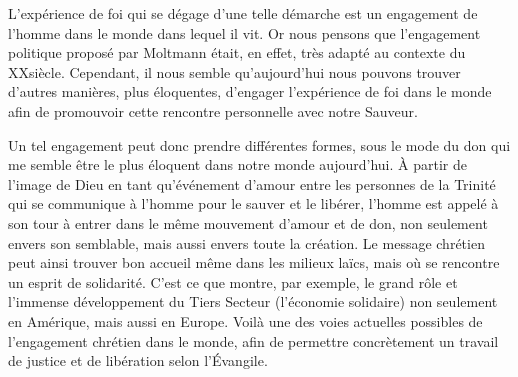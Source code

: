 L’expérience de foi qui se dégage d’une telle démarche est un engagement de l’homme dans le monde dans lequel il vit. Or nous pensons que l’engagement politique proposé par Moltmann était, en effet, très adapté au contexte du XX\ieme siècle. Cependant, il nous semble qu’aujourd’hui nous pouvons trouver  d’autres  manières, plus éloquentes, d’engager l’expérience de foi dans le monde afin de promouvoir cette rencontre  personnelle avec notre Sauveur.

Un tel engagement peut donc prendre différentes formes, sous le mode du don qui me semble être le plus éloquent dans notre monde aujourd’hui. À partir de l’image de Dieu en tant qu’événement d’amour entre les personnes de la Trinité qui se communique à l’homme pour le sauver et le libérer, l’homme est appelé à son tour à entrer dans le même mouvement d’amour et de don, non seulement envers son semblable, mais aussi envers toute la création. Le message chrétien peut ainsi trouver bon accueil même dans les milieux laïcs, mais où se rencontre un esprit de solidarité. C’est ce que montre, par exemple, le grand rôle et l’immense développement du Tiers Secteur (l’économie solidaire) non seulement en Amérique, mais aussi en Europe. Voilà une des voies actuelles possibles de l’engagement chrétien dans le monde, afin de permettre concrètement un travail de justice et de libération selon l’Évangile.  
